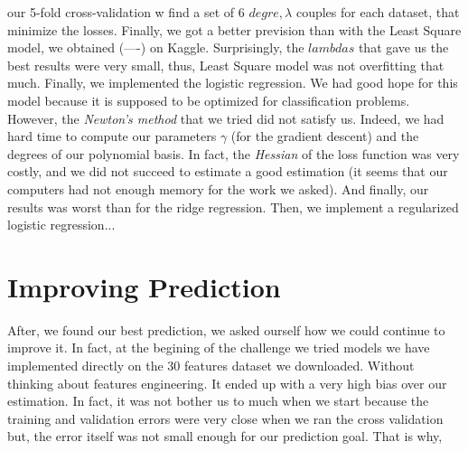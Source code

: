 \documentclass[10pt,conference,compsocconf]{IEEEtran}
\begin{document}
our 5-fold cross-validation w find a set of 6 $degre, \lambda$ couples for each dataset, that minimize the losses. Finally, we got a better prevision than with the Least Square model, we obtained (----) on Kaggle. Surprisingly, the $lambdas$ that gave us the best results were very small, thus, Least Square model was not overfitting that much.
Finally, we implemented the logistic regression. We had good hope for this model because it is supposed to be optimized for classification problems. However, the \textit{Newton's method} that we tried did not satisfy us. Indeed, we had hard time to compute our parameters $\gamma$ (for the gradient descent) and the degrees of our polynomial basis. In fact, the \textit{Hessian} of the loss function was very costly, and we did not succeed to estimate a good estimation (it seems that our computers had not enough memory for the work we asked). And finally, our results was worst than for the  ridge regression. Then, we implement a regularized logistic regression...

\section{Improving Prediction}

After, we found our best prediction, we asked ourself how we could continue to improve it. In fact, at the begining of the challenge we tried models we have implemented directly on the 30 features dataset we downloaded. Without thinking about features engineering. It ended up with a very high bias over our estimation. In fact, it was not bother us to much when we start because the training and validation errors were very close when we ran the cross validation but, the error itself was not small enough for our prediction goal. That is why, 
\end{document}
